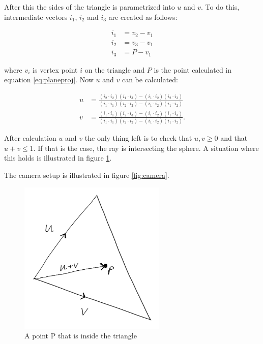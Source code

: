 \documentclass[a4paper]{report}
\begin{document}
After this the sides of the triangle is parametrized into \(u\) and
\(v\). To do this, intermediate vectors \(i_1\), \(i_2\) and \(i_3\)
are created as follows:

\begin{align}
  i_1 &= v_2 - v_1 \nonumber \\
  i_2 &= v_3 - v_1 \nonumber \\
  i_3 &= P - v_1
  \label{eq:intermediate}
\end{align}

where \(v_i\) is vertex point \(i\) on the triangle and \(P\) is the point calculated
in equation \ref{eq:planeproj}. Now \(u\) and \(v\) can be calculated:

\begin{align}
  u &= \frac{(i_2 \cdot i_2)(i_1 \cdot i_3) - (i_1 \cdot i_2)(i_2
    \cdot i_3)}{(i_1 \cdot i_1)(i_2 \cdot i_2) - (i_1 \cdot i_2)(i_1
    \cdot i_2)} \nonumber \\
  v &= \frac{(i_1 \cdot i_1)(i_2 \cdot i_3) - (i_1 \cdot i_2)(i_1
    \cdot i_3)}{(i_1 \cdot i_1)(i_2 \cdot i_2) - (i_1 \cdot i_2)(i_1
    \cdot i_2)}.
  \label{eq:uandv}
\end{align}

After calculation \(u\) and \(v\) the only thing left is to check that
\(u,v \geq 0\) and that \(u+v \leq 1\). If that is the case, the ray
is intersecting the sphere. A situation where this holds is
illustrated in figure \ref{fig:pointintriangle}.

The camera setup is illustrated in figure
\ref{fig:camera}.

\begin{figure}
  \centering
  \includegraphics[width=7cm]{figures/3}
  \caption{A point P that is inside the triangle}
  \label{fig:pointintriangle}
\end{figure}
\end{document}
